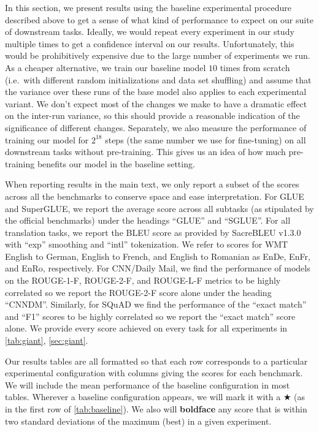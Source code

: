 In this section, we present results using the baseline experimental procedure described above to get a sense of what kind of performance to expect on our suite of downstream tasks. Ideally, we would repeat every experiment in our study multiple times to get a confidence interval on our results. Unfortunately, this would be prohibitively expensive due to the large number of experiments we run. As a cheaper alternative, we train our baseline model $10$ times from scratch (i.e.\ with different random initializations and data set shuffling) and assume that the variance over these runs of the base model also applies to each experimental variant. We don't expect most of the changes we make to have a dramatic effect on the inter-run variance, so this should provide a reasonable indication of the significance of different changes. Separately, we also measure the performance of training our model for $2^{18}$ steps (the same number we use for fine-tuning) on all downstream tasks without pre-training. This gives us an idea of how much pre-training benefits our model in the baseline setting.

When reporting results in the main text, we only report a subset of the scores across all the benchmarks to conserve space and ease interpretation. For GLUE and SuperGLUE, we report the average score across all subtasks (as stipulated by the official benchmarks) under the headings ``GLUE'' and ``SGLUE''. For all translation tasks, we report the BLEU score \citep{papineni2002bleu} as provided by SacreBLEU v1.3.0 \citep{post2018call} with ``exp'' smoothing and ``intl'' tokenization. We refer to scores for WMT English to German, English to French, and English to Romanian as EnDe, EnFr, and EnRo, respectively. For CNN/Daily Mail, we find the performance of models on the ROUGE-1-F, ROUGE-2-F, and ROUGE-L-F metrics \citep{lin2004rouge} to be highly correlated so we report the ROUGE-2-F score alone under the heading ``CNNDM''. Similarly, for SQuAD we find the performance of the ``exact match'' and ``F1'' scores to be highly correlated so we report the ``exact match'' score alone. We provide every score achieved on every task for all experiments in \ref{tab:giant}, \ref{sec:giant}.

Our results tables are all formatted so that each row corresponds to a particular experimental configuration with columns giving the scores for each benchmark. We will include the mean performance of the baseline configuration in most tables. Wherever a baseline configuration appears, we will mark it with a $\bigstar$ (as in the first row of \ref{tab:baseline}).
We also will \textbf{boldface} any score that is within two standard deviations of the maximum (best) in a given experiment.

